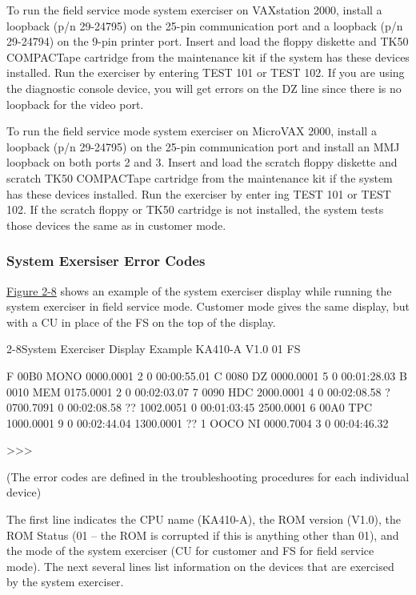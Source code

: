 To run the field service mode system exerciser on VAXstation 2000, install a
loopback (p/n 29-24795) on the 25-pin communication port and a loopback
(p/n 29-24794) on the 9-pin printer port. Insert and load the floppy diskette
and TK50 COMPACTape cartridge from the maintenance kit if the system
has these devices installed. Run the exerciser by entering TEST 101 or TEST
102. If you are using the diagnostic console device, you will get errors on
the DZ line since there is no loopback for the video port.

To run the field service mode system exerciser on MicroVAX 2000, install
a loopback (p/n 29-24795) on the 25-pin communication port and install an
MMJ loopback on both ports 2 and 3. Insert and load the scratch floppy
diskette and scratch TK50 COMPACTape cartridge from the maintenance
kit if the system has these devices installed. Run the exerciser by enter
ing TEST 101 or TEST 102. If the scratch floppy or TK50 cartridge is not
installed, the system tests those devices the same as in customer mode.

\subsubsection{System Exersiser Error Codes}

\hyperref[figure:2-8]{Figure 2-8} shows an example of the system exerciser display while running
the system exerciser in field service mode. Customer mode gives the same
display, but with a CU in place of the FS on the top of the display.

\begin{ttfig}{2-8}{System Exerciser Display Example}
KA410-A V1.0          01     FS

   F  00B0    MONO    0000.0001      2      0 00:00:55.01
   C  0080    DZ      0000.0001      5      0 00:01:28.03
   B  0010    MEM     0175.0001      2      0 00:02:03.07
   7  0090    HDC     2000.0001      4      0 00:02:08.58
?                     0700.7091             0 00:02:08.58
??                    1002.0051             0 00:01:03:45
                      2500.0001
   6  00A0    TPC     1000.0001      9      0 00:02:44.04
                      1300.0001
?? 1  OOCO    NI      0000.7004      3      0 00:04:46.32

>>>

  (The error codes are defined in the troubleshooting
   procedures for each individual device)
\end{ttfig}

The first line indicates the CPU name (KA410-A), the ROM version (V1.0),
the ROM Status (01 -- the ROM is corrupted if this is anything other than
01), and the mode of the system exerciser (CU for customer and FS for field
service mode). The next several lines list information on the devices that
are exercised by the system exerciser.

